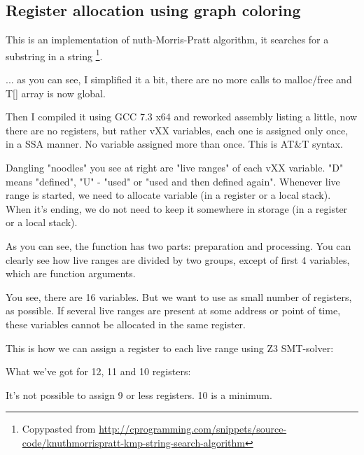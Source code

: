 \subsection{Register allocation using graph coloring}

\renewcommand{\CURPATH}{color/reg_alloc}

This is an implementation of nuth-Morris-Pratt algorithm, it searches for a substring in a string
\footnote{Copypasted from \url{http://cprogramming.com/snippets/source-code/knuthmorrispratt-kmp-string-search-algorithm}}.



... as you can see, I simplified it a bit, there are no more calls to malloc/free and T[] array is now global.

Then I compiled it using GCC 7.3 x64 and reworked assembly listing a little, now there are no registers, but rather vXX variables, each one is assigned only once,
in a \ac{SSA} manner. No variable assigned more than once. This is AT\&T syntax.

%


Dangling "noodles" you see at right are "live ranges" of each vXX variable. "D" means "defined", "U" - "used" or "used and then defined again".
Whenever live range is started, we need to allocate variable (in a register or a local stack).
When it's ending, we do not need to keep it somewhere in storage (in a register or a local stack).

As you can see, the function has two parts: preparation and processing.
You can clearly see how live ranges are divided by two groups, except of first 4 variables, which are function arguments.

You see, there are 16 variables. But we want to use as small number of registers, as possible.
If several live ranges are present at some address or point of time, these variables cannot be allocated in the same register.

This is how we can assign a register to each live range using Z3 SMT-solver:



What we've got for 12, 11 and 10 registers:



It's not possible to assign 9 or less registers. 10 is a minimum.

